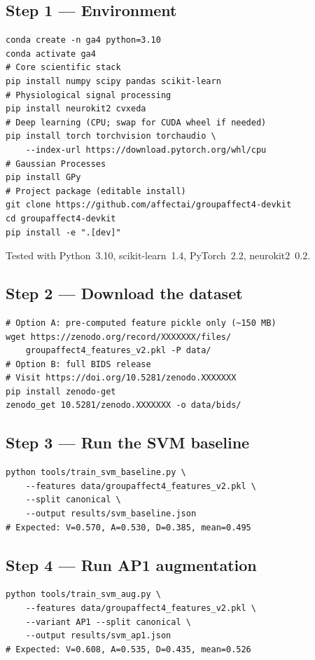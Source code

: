 \documentclass[sigconf,nonacm]{acmart}
\begin{document}
\subsection*{Step 1 — Environment}

\begin{lstlisting}
conda create -n ga4 python=3.10
conda activate ga4
# Core scientific stack
pip install numpy scipy pandas scikit-learn
# Physiological signal processing
pip install neurokit2 cvxeda
# Deep learning (CPU; swap for CUDA wheel if needed)
pip install torch torchvision torchaudio \
    --index-url https://download.pytorch.org/whl/cpu
# Gaussian Processes
pip install GPy
# Project package (editable install)
git clone https://github.com/affectai/groupaffect4-devkit
cd groupaffect4-devkit
pip install -e ".[dev]"
\end{lstlisting}

Tested with Python~3.10, scikit-learn~1.4, PyTorch~2.2, neurokit2~0.2.

\subsection*{Step 2 — Download the dataset}

\begin{lstlisting}
# Option A: pre-computed feature pickle only (~150 MB)
wget https://zenodo.org/record/XXXXXXX/files/
    groupaffect4_features_v2.pkl -P data/
# Option B: full BIDS release
# Visit https://doi.org/10.5281/zenodo.XXXXXXX
pip install zenodo-get
zenodo_get 10.5281/zenodo.XXXXXXX -o data/bids/
\end{lstlisting}

\subsection*{Step 3 — Run the SVM baseline}

\begin{lstlisting}
python tools/train_svm_baseline.py \
    --features data/groupaffect4_features_v2.pkl \
    --split canonical \
    --output results/svm_baseline.json
# Expected: V=0.570, A=0.530, D=0.385, mean=0.495
\end{lstlisting}

\subsection*{Step 4 — Run AP1 augmentation}

\begin{lstlisting}
python tools/train_svm_aug.py \
    --features data/groupaffect4_features_v2.pkl \
    --variant AP1 --split canonical \
    --output results/svm_ap1.json
# Expected: V=0.608, A=0.535, D=0.435, mean=0.526
\end{lstlisting}
\end{document}
